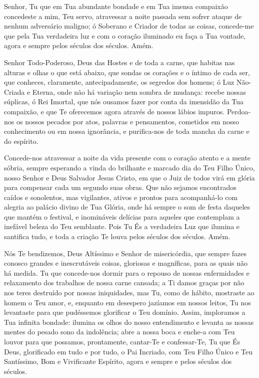 \documentclass{subfiles}
\begin{document}

Senhor, Tu que em Tua abundante bondade e em Tua imensa compaixão concedeste a
mim, Teu servo, atravessar a noite passada sem sofrer ataque de nenhum
adversário maligno; ó Soberano e Criador de todas as coisas, concede-me que pela
Tua verdadeira luz e com o coração iluminado eu faça a Tua vontade, agora e
sempre pelos séculos dos séculos. Amém.


Senhor Todo-Poderoso, Deus das Hostes e de toda a carne, que habitas nas alturas
e olhas o que está abaixo, que sondas os corações e o íntimo de cada ser, que
conheces, claramente, antecipadamente, os segredos dos homens; ó Luz Não-Criada e
Eterna, onde não há variação nem sombra de mudança: recebe nossas súplicas, ó
Rei Imortal, que nós ousamos fazer por conta da imensidão da Tua compaixão, e
que Te oferecemos agora através de nossos lábios impuros. Perdoa-nos os nossos
pecados por atos, palavras e pensamentos, cometidos em nosso conhecimento ou em
nossa ignorância, e purifica-nos de toda mancha da carne e do espírito.

Concede-nos atravessar a noite da vida presente com o coração atento e a mente
sóbria, sempre esperando a vinda do brilhante e marcado dia do Teu Filho Único,
nosso Senhor e Deus Salvador Jesus Cristo, em que o Juiz de todos virá em glória
para compensar cada um segundo suas obras. Que não sejamos encontrados caídos e
sonolentos, mas vigilantes, ativos e prontos para acompanhá-lo com alegria ao
palácio divino de Tua Glória, onde há sempre o som de festa daqueles que mantém
o festival, e inomináveis delícias para aqueles que contemplam a inefável beleza
do Teu semblante. Pois Tu És a verdadeira Luz que ilumina e santifica tudo, e
toda a criação Te louva pelos séculos dos séculos. Amém.


Nós Te bendizemos, Deus Altíssimo e Senhor de misericórdia, que
sempre fazes conosco grandes e inescrutáveis coisas, gloriosas e magníficas,
para as quais não há medida. Tu que concede-nos dormir para o repouso de
nossas enfermidades e relaxamento dos trabalhos de nossa carne cansada; a
Ti damos graças por não nos teres destruído por nossas iniquidades, mas Tu,
como de hábito, mostraste ao homem o Teu amor, e, enquanto em desespero
jazíamos em nossos leitos, Tu nos levantaste para que pudéssemos glorificar o
Teu domínio. Assim, imploramos a Tua infinita bondade: ilumina os olhos do
nosso entendimento e levanta as nossas mentes do pesado sono da indolência;
abre a nossa boca e enche-a com Teu louvor para que possamos, prontamente,
cantar-Te e confessar-Te, Tu que És Deus, glorificado em tudo e por tudo, o Pai
Incriado, com Teu Filho Único e Teu Santíssimo, Bom e Vivificante Espírito,
agora e sempre e pelos séculos dos séculos.
\end{document}

